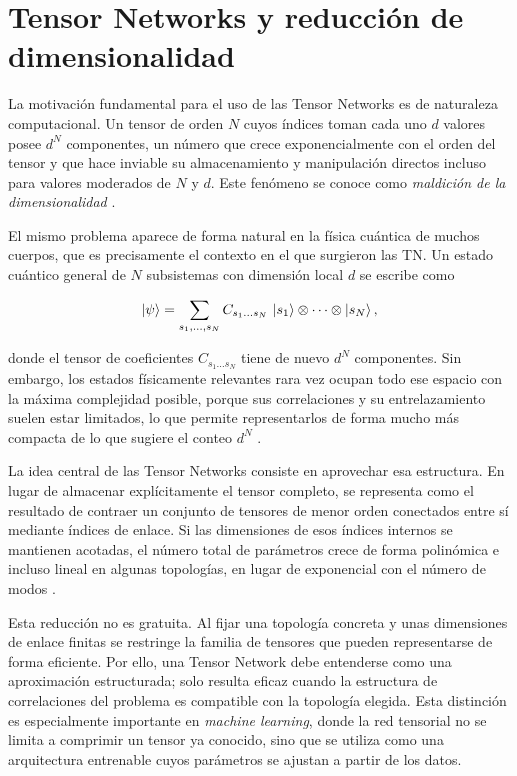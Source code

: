 \section{Tensor Networks y reducción de dimensionalidad}

La motivación fundamental para el uso de las Tensor Networks es de naturaleza computacional. Un tensor de orden $N$ cuyos índices toman cada uno $d$ valores posee $d^N$ componentes, un número que crece exponencialmente con el orden del tensor y que hace inviable su almacenamiento y manipulación directos incluso para valores moderados de $N$ y $d$. Este fenómeno se conoce como \textit{maldición de la dimensionalidad} .

El mismo problema aparece de forma natural en la física cuántica de muchos cuerpos, que es precisamente el contexto en el que surgieron las TN. Un estado cuántico general de $N$ subsistemas con dimensión local $d$ se escribe como

\begin{equation} \label{eq: estado_general}
    \ket{\psi} =
    \sum_{s_1,\ldots,s_N}
    C_{s_1\ldots s_N}\,
    \ket{s_1}\otimes\cdots\otimes\ket{s_N},
\end{equation}

donde el tensor de coeficientes $C_{s_1\ldots s_N}$ tiene de nuevo $d^N$ componentes. Sin embargo, los estados físicamente relevantes rara vez ocupan todo ese espacio con la máxima complejidad posible, porque sus correlaciones y su entrelazamiento suelen estar limitados, lo que permite representarlos de forma mucho más compacta de lo que sugiere el conteo $d^N$ .

La idea central de las Tensor Networks consiste en aprovechar esa estructura. En lugar de almacenar explícitamente el tensor completo, se representa como el resultado de contraer un conjunto de tensores de menor orden conectados entre sí mediante índices de enlace. Si las dimensiones de esos índices internos se mantienen acotadas, el número total de parámetros crece de forma polinómica e incluso lineal en algunas topologías, en lugar de exponencial con el número de modos .

Esta reducción no es gratuita. Al fijar una topología concreta y unas dimensiones de enlace finitas se restringe la familia de tensores que pueden representarse de forma eficiente. Por ello, una Tensor Network debe entenderse como una aproximación estructurada; solo resulta eficaz cuando la estructura de correlaciones del problema es compatible con la topología elegida. Esta distinción es especialmente importante en \textit{machine learning}, donde la red tensorial no se limita a comprimir un tensor ya conocido, sino que se utiliza como una arquitectura entrenable cuyos parámetros se ajustan a partir de los datos.

